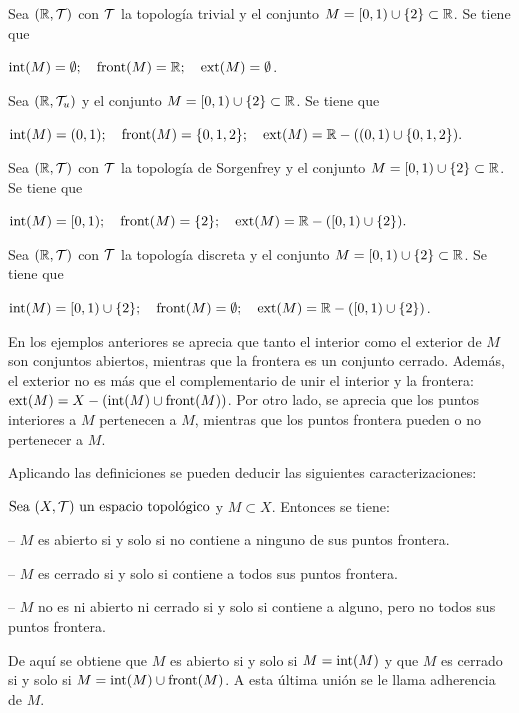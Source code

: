 \begin{ejs}\label{ej:11}
    \item Sea $(\R, \cT)$ con $\cT$ la topología trivial y el conjunto $M = [0,1)\cup \{2\}\subset \R$. Se tiene que 
    \begin{center}
        $\interior{M} = \emptyset;\quad \frontera{M} = \R;\quad \exterior{M} = \emptyset$.
    \end{center}
    \item Sea $\topusu$ y el conjunto $M = [0,1)\cup \{2\}\subset \R$. Se tiene que 
    \begin{center}
        $\interior{M} = (0,1);\quad \frontera{M} = \{0,1,2\};\quad \exterior{M} = \R - ((0,1)\cup \{0,1,2\}).$
    \end{center}
    \item Sea $(\R,\cT)$ con $\cT$ la topología de Sorgenfrey y el conjunto $M = [0,1)\cup \{2\}\subset \R$. Se tiene que 
    \begin{center}
        $\interior{M} = [0,1);\quad \frontera{M} = \{2\};\quad \exterior{M} = \R - ([0,1)\cup \{2\}).$
    \end{center}
    \item Sea $(\R,\cT)$ con $\cT$ la topología discreta y el conjunto $M = [0,1)\cup \{2\}\subset \R$. Se tiene que 
    \begin{center}
        $\interior{M} = [0,1)\cup \{2\};\quad \frontera{M} = \emptyset;\quad \exterior{M} = \R - ([0,1)\cup \{2\})$.
    \end{center}    
\end{ejs}

En los ejemplos anteriores se aprecia que tanto el interior como el exterior de $M$ son conjuntos abiertos, mientras que la frontera es un conjunto cerrado. Además, el exterior no es más que el complementario de unir el interior y la frontera: $\exterior{M} = X - (\interior{M} \cup \frontera{M})$. Por otro lado, se aprecia que los puntos interiores a $M$ pertenecen a $M$, mientras que los puntos frontera pueden o no pertenecer a $M$. \bigskip

Aplicando las definiciones se pueden deducir las siguientes caracterizaciones:
\begin{prop}
    $\seatop$ y $M\subset X$. Entonces se tiene:
    \item -- $M$ es abierto si y solo si no contiene a ninguno de sus puntos frontera.
    \item -- $M$ es cerrado si y solo si contiene a todos sus puntos frontera.
    \item -- $M$ no es ni abierto ni cerrado si y solo si contiene a alguno, pero no todos sus puntos frontera.
\end{prop}
De aquí se obtiene que $M$ es abierto si y solo si $M = \interior{M}$ y que $M$ es cerrado si y solo si $M = \interior{M} \cup \frontera{M}$. A esta última unión se le llama adherencia de $M$.


